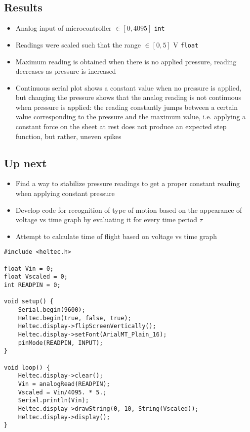 \documentclass[12pt,a4paper]{article}
\begin{document}
\subsection*{Results}
\begin{itemize}
	\item Analog input of microcontroller $\in [0, 4095]$ \texttt{int}
	\item Readings were scaled such that the range $\in [0, 5]$ V \texttt{float}
	\item Maximum reading is obtained when there is no applied pressure, reading decreases as pressure is increased
	\item Continuous serial plot shows a constant value when no pressure is applied, but changing the pressure shows that the analog reading is not continuous when pressure is applied: the reading constantly jumps between a certain value corresponding to the pressure and the maximum value, i.e. applying a constant force on the sheet at rest does not produce an expected step function, but rather, uneven spikes
\end{itemize}

\subsection*{Up next}
\begin{itemize}
	\item Find a way to stabilize pressure readings to get a proper constant reading when applying constant pressure
	\item Develop code for recognition of type of motion based on the appearance of voltage vs time graph by evaluating it for every time period $\tau$
	\item Attempt to calculate time of flight based on voltage vs time graph
\end{itemize}

\begin{lstlisting}
#include <heltec.h>

float Vin = 0;
float Vscaled = 0;
int READPIN = 0;

void setup() {
	Serial.begin(9600);
	Heltec.begin(true, false, true);
	Heltec.display->flipScreenVertically();
	Heltec.display->setFont(ArialMT_Plain_16);
	pinMode(READPIN, INPUT);
}

void loop() {
	Heltec.display->clear();
	Vin = analogRead(READPIN);
	Vscaled = Vin/4095. * 5.;
	Serial.println(Vin);
	Heltec.display->drawString(0, 10, String(Vscaled));
	Heltec.display->display();
}
\end{lstlisting}
\end{document}
